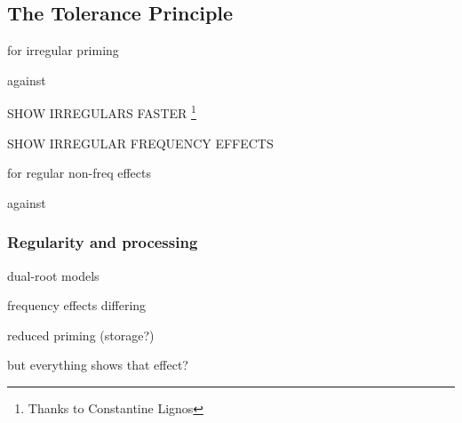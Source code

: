 \subsection{The Tolerance Principle}

\citet{Yang2005a}
\citet{LegateInPress}

for irregular priming
\citet{Emmorey1989}
\citet{Allen2002}
\citet{Stockall2006}

against
\citet{Stanners1979}
\citet{Marslen-Wilson1993}

\citet{ELP}

SHOW IRREGULARS FASTER
\footnote{Thanks to Constantine Lignos}

SHOW IRREGULAR FREQUENCY EFFECTS

for regular non-freq effects
\citet{Lignos2012}

against
\citet{Alegre1999}
\citet{Gordon1999}
\citet{Baayen2008b}

\subsubsection{Regularity and processing}

\citet{Yang2005a}

dual-root models \citet{Baayen1997b}

frequency effects differing

reduced priming (storage?)
\citet{Stanners1979}
\citet{Marslen-Wilson1993}

\citet{ODonnell2011a}
\citet{ODonnell2011b}

but everything shows that effect?

\citet{Alegre1999}
\citet{Gordon1999}


